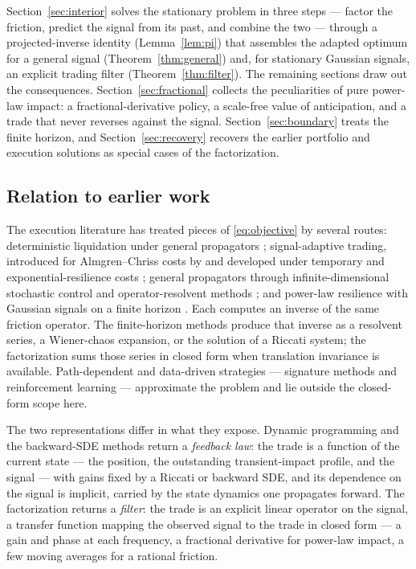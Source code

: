 \documentclass[11pt]{article}
\theoremstyle{plain}
\theoremstyle{definition}
\theoremstyle{remark}
\begin{document}
Section~\ref{sec:interior} solves the stationary problem in three steps --- factor the friction, predict the signal from its past, and combine the two --- through a projected-inverse identity (Lemma~\ref{lem:pi}) that assembles the adapted optimum for a general signal (Theorem~\ref{thm:general}) and, for stationary Gaussian signals, an explicit trading filter (Theorem~\ref{thm:filter}). The remaining sections draw out the consequences. Section~\ref{sec:fractional} collects the peculiarities of pure power-law impact: a fractional-derivative policy, a scale-free value of anticipation, and a trade that never reverses against the signal. Section~\ref{sec:boundary} treats the finite horizon, and Section~\ref{sec:recovery} recovers the earlier portfolio and execution solutions as special cases of the factorization.

\subsection{Relation to earlier work}\label{sec:relatedwork}

The execution literature has treated pieces of \eqref{eq:objective} by several routes: deterministic liquidation under general propagators \citep{GatheralSchiedSlynko2012}; signal-adaptive trading, introduced for Almgren--Chriss costs by \citet{CarteaJaimungal2013} and developed under temporary and exponential-resilience costs \citep{LehalleNeuman2019,NeumanVoss2022,BankSonerVoss2017}; general propagators through infinite-dimensional stochastic control \citep{AbiJaberNeuman2025} and operator-resolvent methods \citep{AbiJaberNeumanTuschmann2024}; and power-law resilience with Gaussian signals on a finite horizon \citep{FordeSanchezSmith2022}. Each computes an inverse of the same friction operator. The finite-horizon methods produce that inverse as a resolvent series, a Wiener-chaos expansion, or the solution of a Riccati system; the factorization sums those series in closed form when translation invariance is available. Path-dependent and data-driven strategies --- signature methods \citep{KalsiLyonsPerezArribas2020} and reinforcement learning --- approximate the problem and lie outside the closed-form scope here.

The two representations differ in what they expose. Dynamic programming and the backward-SDE methods return a \emph{feedback law}: the trade is a function of the current state --- the position, the outstanding transient-impact profile, and the signal --- with gains fixed by a Riccati or backward SDE, and its dependence on the signal is implicit, carried by the state dynamics one propagates forward. The factorization returns a \emph{filter}: the trade is an explicit linear operator on the signal, a transfer function mapping the observed signal to the trade in closed form --- a gain and phase at each frequency, a fractional derivative for power-law impact, a few moving averages for a rational friction.
\end{document}
